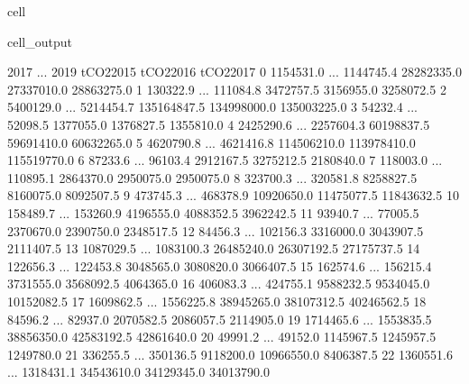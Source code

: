 \documentclass[letterpaper,10pt,english]{jupyterBook}
\begin{document}
\begin{sphinxuseclass}{cell}
\begin{sphinxVerbatimOutput}
\begin{sphinxuseclass}{cell_output}
\begin{sphinxVerbatim}[commandchars=\\\{\}]
         2017  ...       2019    tCO2\PYGZus{}2015    tCO2\PYGZus{}2016    tCO2\PYGZus{}2017  \PYGZbs{}
0   1154531.0  ...  1144745.4   28282335.0   27337010.0   28863275.0   
1    130322.9  ...   111084.8    3472757.5    3156955.0    3258072.5   
2   5400129.0  ...  5214454.7  135164847.5  134998000.0  135003225.0   
3     54232.4  ...    52098.5    1377055.0    1376827.5    1355810.0   
4   2425290.6  ...  2257604.3   60198837.5   59691410.0   60632265.0   
5   4620790.8  ...  4621416.8  114506210.0  113978410.0  115519770.0   
6     87233.6  ...    96103.4    2912167.5    3275212.5    2180840.0   
7    118003.0  ...   110895.1    2864370.0    2950075.0    2950075.0   
8    323700.3  ...   320581.8    8258827.5    8160075.0    8092507.5   
9    473745.3  ...   468378.9   10920650.0   11475077.5   11843632.5   
10   158489.7  ...   153260.9    4196555.0    4088352.5    3962242.5   
11    93940.7  ...    77005.5    2370670.0    2390750.0    2348517.5   
12    84456.3  ...   102156.3    3316000.0    3043907.5    2111407.5   
13  1087029.5  ...  1083100.3   26485240.0   26307192.5   27175737.5   
14   122656.3  ...   122453.8    3048565.0    3080820.0    3066407.5   
15   162574.6  ...   156215.4    3731555.0    3568092.5    4064365.0   
16   406083.3  ...   424755.1    9588232.5    9534045.0   10152082.5   
17  1609862.5  ...  1556225.8   38945265.0   38107312.5   40246562.5   
18    84596.2  ...    82937.0    2070582.5    2086057.5    2114905.0   
19  1714465.6  ...  1553835.5   38856350.0   42583192.5   42861640.0   
20    49991.2  ...    49152.0    1145967.5    1245957.5    1249780.0   
21   336255.5  ...   350136.5    9118200.0   10966550.0    8406387.5   
22  1360551.6  ...  1318431.1   34543610.0   34129345.0   34013790.0   


\end{sphinxVerbatim}
\end{sphinxuseclass}
\end{sphinxVerbatimOutput}
\end{sphinxuseclass}
\end{document}
